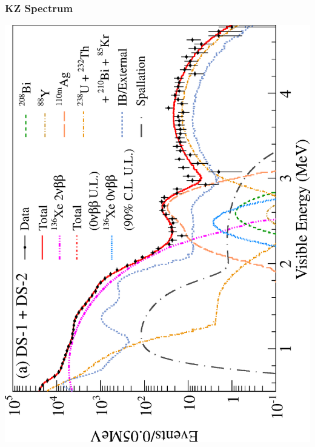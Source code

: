 \documentclass{beamer}
\begin{document}
\begin{frame}
\begin{center}
\frametitle{KZ Spectrum}
\end{center}
\begin{center}
\includegraphics[keepaspectratio=true,angle=-90,width=\textwidth]{KZ_spectrum.eps}
\end{center}
\end{frame}
\end{document}
